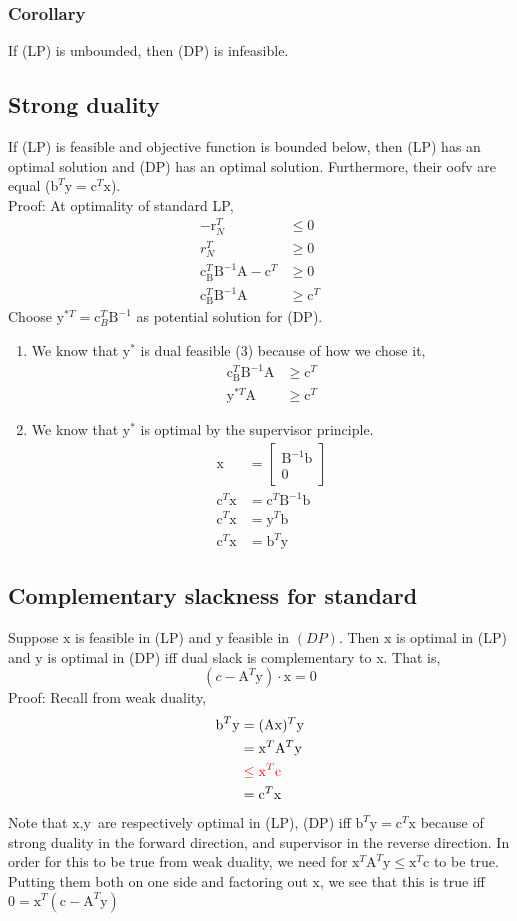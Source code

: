 \documentclass[6pt]{article}
\def\x{\textrm{x}}
\def\y{\textrm{y}}
\def\c{\textrm{c}}
\def\r{\textrm{r}}
\def\b{\textrm{b}}
\def\A{\textrm{A}}
\def\B{\textrm{B}}
\begin{document}
\subsubsection{Corollary}
If (LP) is unbounded, then (DP) is infeasible.

\subsection{Strong duality}
If (LP) is feasible and objective function is bounded below, then (LP) has an optimal solution and (DP) has an optimal solution. Furthermore, their oofv are equal ($\b^T\y=\c^T\x$).\\
Proof: At optimality of standard LP,
\begin{align*}-\r_N^T &\leq 0\\
r_N^T &\geq 0\\
\c_\B^T\B^{-1}\A - \c^T &\geq 0\\
\c_\B^T\B^{-1}\A &\geq \c^T
\end{align*}
Choose $\y^{*T} = \c_B^T\B^{-1}$ as potential solution for (DP).
\begin{enumerate}
    \item We know that $\y^*$ is dual feasible (3) because of how we chose it,
    \begin{align*}
    \c_\B^T\B^{-1}\A &\geq \c^T\\
    \y^{*T}\A &\geq \c^T
    \end{align*}
    \item We know that $\y^*$ is optimal by the supervisor principle.
    \begin{align*}
        \x&=\begin{bmatrix}\B^{-1}\b\\0\end{bmatrix}\\
        \c^T\x &= \c^T\B^{-1}\b\\
        \c^T\x &= \y^T\b\\
        \c^T\x &= \b^T\y
    \end{align*}
\end{enumerate}


\subsection{Complementary slackness for standard}
Suppose $\x$ is feasible in (LP) and $\y$ feasible in $(DP)$. Then $\x$ is optimal in (LP) and $\y$ is optimal in (DP) iff dual slack is complementary to x. That is,
$$(c-\A^T\y)\cdot \x = 0$$
Proof: Recall from weak duality,
\begin{align*}
    \b^T\y &= (\A\x)^T\y\\
    &= \x^T\A^T\y\\
    &\color{red}\leq \x^T\c\\
    &=\c^T\x
\end{align*}
Note that $\x,\y$ are respectively optimal in (LP), (DP) iff $\b^T\y = \c^T\x$ because of strong duality in the forward direction, and supervisor in the reverse direction. In order for this to be true from weak duality, we need for $\x^T\A^T\y \leq \x^T\c$ to be true. Putting them both on one side and factoring out $\x$, we see that this is true iff $0 = \x^T(\c-\A^T\y)$
\end{document}
